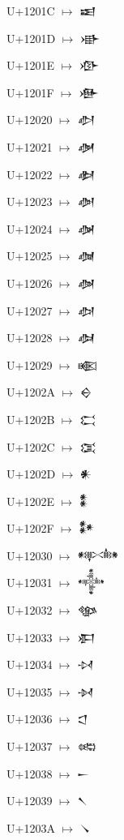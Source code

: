 {\noindent U+1201C  $\mapsto$ {\cufont 𒀜}\par
\noindent U+1201D  $\mapsto$ {\cufont 𒀝}\par
\noindent U+1201E  $\mapsto$ {\cufont 𒀞}\par
\noindent U+1201F  $\mapsto$ {\cufont 𒀟}\par
\noindent U+12020  $\mapsto$ {\cufont 𒀠}\par
\noindent U+12021  $\mapsto$ {\cufont 𒀡}\par
\noindent U+12022  $\mapsto$ {\cufont 𒀢}\par
\noindent U+12023  $\mapsto$ {\cufont 𒀣}\par
\noindent U+12024  $\mapsto$ {\cufont 𒀤}\par
\noindent U+12025  $\mapsto$ {\cufont 𒀥}\par
\noindent U+12026  $\mapsto$ {\cufont 𒀦}\par
\noindent U+12027  $\mapsto$ {\cufont 𒀧}\par
\noindent U+12028  $\mapsto$ {\cufont 𒀨}\par
\noindent U+12029  $\mapsto$ {\cufont 𒀩}\par
\noindent U+1202A  $\mapsto$ {\cufont 𒀪}\par
\noindent U+1202B  $\mapsto$ {\cufont 𒀫}\par
\noindent U+1202C  $\mapsto$ {\cufont 𒀬}\par
\noindent U+1202D  $\mapsto$ {\cufont 𒀭}\par
\noindent U+1202E  $\mapsto$ {\cufont 𒀮}\par
\noindent U+1202F  $\mapsto$ {\cufont 𒀯}\par
\noindent U+12030  $\mapsto$ {\cufont 𒀰}\par
\noindent U+12031  $\mapsto$ {\cufont 𒀱}\par
\noindent U+12032  $\mapsto$ {\cufont 𒀲}\par
\noindent U+12033  $\mapsto$ {\cufont 𒀳}\par
\noindent U+12034  $\mapsto$ {\cufont 𒀴}\par
\noindent U+12035  $\mapsto$ {\cufont 𒀵}\par
\noindent U+12036  $\mapsto$ {\cufont 𒀶}\par
\noindent U+12037  $\mapsto$ {\cufont 𒀷}\par
\noindent U+12038  $\mapsto$ {\cufont 𒀸}\par
\noindent U+12039  $\mapsto$ {\cufont 𒀹}\par
\noindent U+1203A  $\mapsto$ {\cufont 𒀺}\par
}
